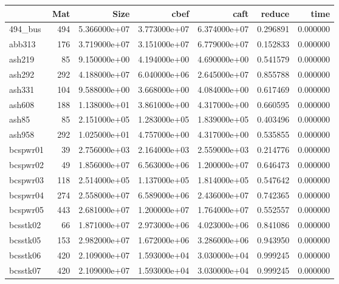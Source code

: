 \begin{tabular}{lrrrrrr}
\toprule
{} &  Mat &          Size &          cbef &          caft &    reduce &      time \\
\midrule
494\_bus                 &  494 &  5.366000e+07 &  3.773000e+07 &  6.374000e+07 &  0.296891 &  0.000000 \\
abb313                  &  176 &  3.719000e+07 &  3.151000e+07 &  6.779000e+07 &  0.152833 &  0.000000 \\
ash219                  &   85 &  9.150000e+00 &  4.194000e+00 &  4.690000e+00 &  0.541579 &  0.000000 \\
ash292                  &  292 &  4.188000e+07 &  6.040000e+06 &  2.645000e+07 &  0.855788 &  0.000000 \\
ash331                  &  104 &  9.588000e+00 &  3.668000e+00 &  4.084000e+00 &  0.617469 &  0.000000 \\
ash608                  &  188 &  1.138000e+01 &  3.861000e+00 &  4.317000e+00 &  0.660595 &  0.000000 \\
ash85                   &   85 &  2.151000e+05 &  1.283000e+05 &  1.839000e+05 &  0.403496 &  0.000000 \\
ash958                  &  292 &  1.025000e+01 &  4.757000e+00 &  4.317000e+00 &  0.535855 &  0.000000 \\
bcspwr01                &   39 &  2.756000e+03 &  2.164000e+03 &  2.559000e+03 &  0.214776 &  0.000000 \\
bcspwr02                &   49 &  1.856000e+07 &  6.563000e+06 &  1.200000e+07 &  0.646473 &  0.000000 \\
bcspwr03                &  118 &  2.514000e+05 &  1.137000e+05 &  1.814000e+05 &  0.547642 &  0.000000 \\
bcspwr04                &  274 &  2.558000e+07 &  6.589000e+06 &  2.436000e+07 &  0.742365 &  0.000000 \\
bcspwr05                &  443 &  2.681000e+07 &  1.200000e+07 &  1.764000e+07 &  0.552557 &  0.000000 \\
bcsstk02                &   66 &  1.871000e+07 &  2.973000e+06 &  4.023000e+06 &  0.841086 &  0.000000 \\
bcsstk05                &  153 &  2.982000e+07 &  1.672000e+06 &  3.286000e+06 &  0.943950 &  0.000000 \\
bcsstk06                &  420 &  2.109000e+07 &  1.593000e+04 &  3.030000e+04 &  0.999245 &  0.000000 \\
bcsstk07                &  420 &  2.109000e+07 &  1.593000e+04 &  3.030000e+04 &  0.999245 &  0.000000 \\

\end{tabular}
